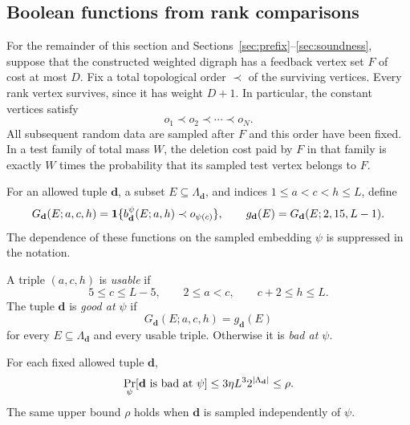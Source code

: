 \subsection{Boolean functions from rank comparisons}

For the remainder of this section and
Sections~\ref{sec:prefix}--\ref{sec:soundness}, suppose that the constructed
weighted digraph has a feedback vertex set $F$ of cost at most $D$.
Fix a total topological order $\prec$ of the surviving vertices.  Every
rank vertex survives, since it has weight $D+1$.  In particular, the
constant vertices satisfy
\[
  o_1\prec o_2\prec\cdots\prec o_N.
\]
All subsequent random data are sampled after $F$ and this order have been
fixed.  In a test family of total mass $W$, the deletion cost paid by $F$
in that family is exactly $W$ times the probability that its sampled test
vertex belongs to $F$.

For an allowed tuple $\mathbf d$, a subset $E\subseteq\Lambda_{\mathbf d}$,
and indices $1\le a<c<h\le L$, define
\begin{equation}
\label{eq:rank-comparison-bits}
  G_{\mathbf d}(E;a,c,h)
   =\mathbf 1\{b_{\mathbf d}^{\psi}(E;a,h)\prec o_{\psi(c)}\},
  \qquad
  g_{\mathbf d}(E)=G_{\mathbf d}(E;2,15,L-1).
\end{equation}
The dependence of these functions on the sampled embedding $\psi$ is
suppressed in the notation.

\begin{definition}
\label{def:good-tuple}
A triple $(a,c,h)$ is \emph{usable} if
\begin{equation}
\label{eq:usable-triples}
  5\le c\le L-5,\qquad 2\le a<c,\qquad c+2\le h\le L.
\end{equation}
The tuple $\mathbf d$ is \emph{good at $\psi$} if
\[
  G_{\mathbf d}(E;a,c,h)=g_{\mathbf d}(E)
\]
for every $E\subseteq\Lambda_{\mathbf d}$ and every usable triple.
Otherwise it is \emph{bad at $\psi$}.
\end{definition}

\begin{lemma}
\label{lem:goodness}
For each fixed allowed tuple $\mathbf d$,
\begin{equation}
\label{eq:goodness-probability}
  \Pr_{\psi}[\mathbf d\text{ is bad at }\psi]
  \le 3\eta L^3 2^{\lvert\Lambda_{\mathbf d}\rvert}
  \le\rho.
\end{equation}
The same upper bound $\rho$ holds when $\mathbf d$ is sampled independently
of $\psi$.
\end{lemma}

